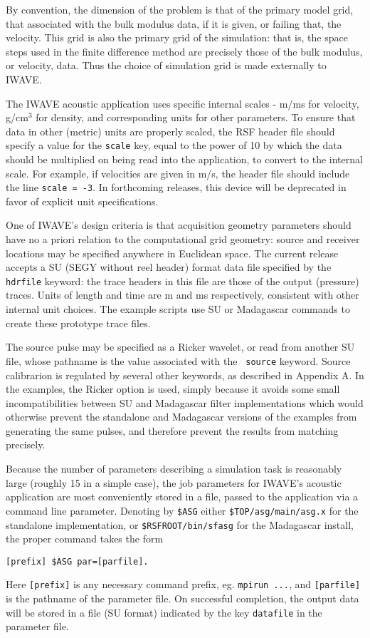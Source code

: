 By convention, the dimension of the problem is that of the primary
model grid, that associated with the bulk modulus data, if it is given, or
failing that, the velocity. This grid is also the primary grid of the
simulation: that is, the space steps used in the finite difference
method are precisely those of the bulk modulus, or velocity, data.
Thus the choice of simulation grid is made externally to IWAVE.

The IWAVE acoustic application uses specific internal scales - m/ms
for velocity, g/cm$^3$ for density, and corresponding units for other
parameters. To ensure that data in other (metric) units are properly
scaled, the RSF header file should specify a value for the {\tt scale}
key, equal to the power of 10 by which the data should be multiplied
on being read into the application, to convert to the internal
scale. For example, if velocities are given in m/s, the header file
should include the line {\tt scale = -3}. In forthcoming releases,
this device will be deprecated in favor of explicit unit
specifications.

One of IWAVE's design criteria is that acquisition geometry parameters
should have no a priori relation to the computational grid geometry:
source and receiver locations may be specified anywhere in Euclidean
space. The current release accepts a SU (SEGY without reel header)
format data file specified by the {\tt hdrfile} keyword: the trace
headers in this file are those of the output (pressure) traces. Units of
length and time are m and ms respectively, consistent with other
internal unit choices. The example scripts use SU or Madagascar
commands to create these prototype trace files.

The source pulse may be specified as a Ricker wavelet, or read from
another SU file, whose pathname is the value associated with the {\tt
  source} keyword. Source calibrarion is regulated by several other
keywords, as described in Appendix A. In the examples, the Ricker
option is used, simply because it avoids some small incompatibilities
between SU and Madagascar filter implementations which would otherwise
prevent the standalone and Madagascar versions of the examples from
generating the same pulses, and therefore prevent the results from
matching precisely. 

Because the number of
parameters describing a simulation task is reasonably large (roughly
15 in a simple case), the job parameters for IWAVE's acoustic
application are most conveniently stored in a file, passed to the
application via a command line parameter. Denoting by {\tt \$ASG}
either {\tt \$TOP/asg/main/asg.x} for the standalone implementation,
or {\tt \$RSFROOT/bin/sfasg} for the Madagascar install, the proper
command takes the form
\begin{verbatim}
[prefix] $ASG par=[parfile].
\end{verbatim}
Here {\tt [prefix]} is any necessary command prefix, eg. {\tt mpirun
  ...}, and {\tt [parfile]} is the pathname of the parameter file. On
successful completion, the output data will be stored in a file (SU
format) indicated by the key {\tt datafile} in the parameter file.


